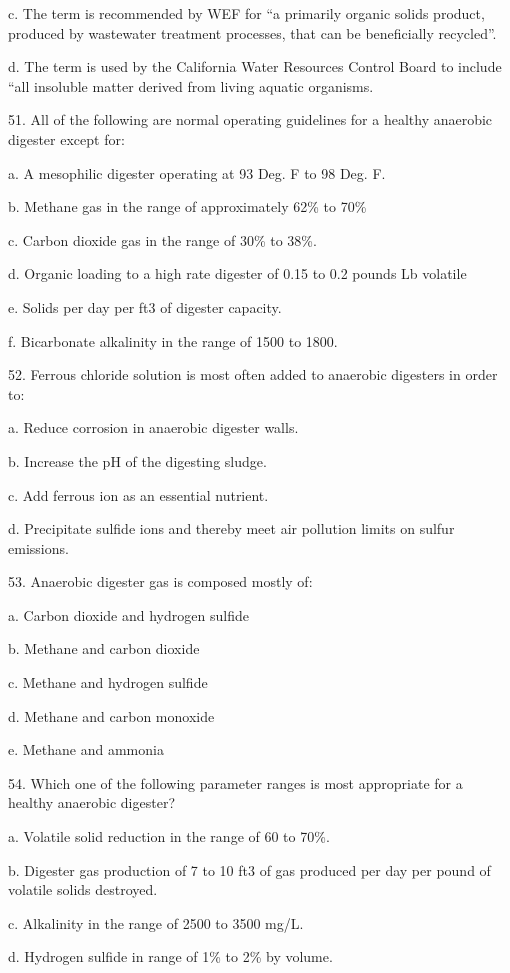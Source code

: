 \documentclass{article}
\begin{document}
c. The term is recommended by WEF for “a primarily organic solids product, produced by wastewater treatment processes, that can be beneficially recycled”. 

d. The term is used by the California Water Resources Control Board to include “all insoluble matter derived from living aquatic organisms. 


51. All of the following are normal operating guidelines for a healthy anaerobic digester except for: 

a. A mesophilic digester operating at 93 Deg. F to 98 Deg. F. 

b. Methane gas in the range of approximately 62\% to 70\% 

c. Carbon dioxide gas in the range of 30\% to 38\%. 

d. Organic loading to a high rate digester of 0.15 to 0.2 pounds Lb volatile 

e. Solids per day per ft3 of digester capacity. 

f. Bicarbonate alkalinity in the range of 1500 to 1800. 


52. Ferrous chloride solution is most often added to anaerobic digesters in order to: 

a. Reduce corrosion in anaerobic digester walls. 

b. Increase the pH of the digesting sludge. 

c. Add ferrous ion as an essential nutrient. 

d. Precipitate sulfide ions and thereby meet air pollution limits on sulfur emissions. 


53. Anaerobic digester gas is composed mostly of: 

a. Carbon dioxide and hydrogen sulfide 

b. Methane and carbon dioxide 

c. Methane and hydrogen sulfide 

d. Methane and carbon monoxide 

e. Methane and ammonia 


54. Which one of the following parameter ranges is most appropriate for a healthy anaerobic digester? 

a. Volatile solid reduction in the range of 60 to 70\%. 

b. Digester gas production of 7 to 10 ft3 of gas produced per day per pound of volatile solids destroyed. 

c. Alkalinity in the range of 2500 to 3500 mg/L. 

d. Hydrogen sulfide in range of 1\% to 2\% by volume. 
\end{document}
